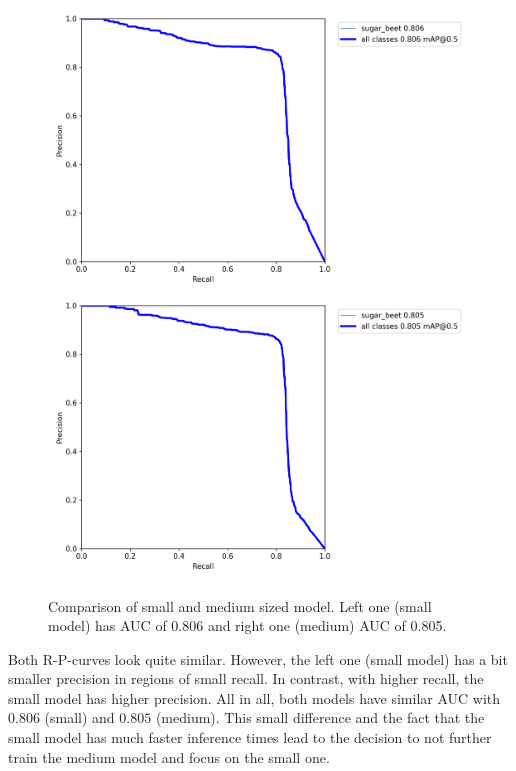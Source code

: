 \begin{figure}[htb!]
	\centering
	\includegraphics[scale=0.1]{figures/comp_small.png}
	\includegraphics[scale=0.1]{figures/comp_medium.png}
	\caption{Comparison of small and medium sized model. Left one (small model) has AUC of 0.806 and right one (medium) AUC of 0.805.}
	\label{fig:comparison_small_medium}
\end{figure}

Both R-P-curves look quite similar. However, the left one (small model) has a bit smaller precision in regions of small recall. In contrast, with higher recall, the small model has higher precision. All in all, both models have similar AUC with $ 0.806 $ (small) and $ 0.805 $ (medium). This small difference and the fact that the small model has much faster inference times lead to the decision to not further train the medium model and focus on the small one. \\

